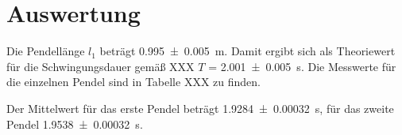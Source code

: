 \section{Auswertung}
\label{sec:Auswertung}
Die Pendellänge $l_1$ beträgt \SI{0.995 +- 0.005}{\meter}. Damit ergibt
sich als Theoriewert für die Schwingungsdauer gemäß XXX
$T$ = \SI{2.001 +- 0.005}{\second}. Die Messwerte für die einzelnen Pendel
sind in Tabelle XXX zu finden.


Der Mittelwert für das erste Pendel beträgt \SI{1.9284 +- 0.00032}{\second}, für
das zweite Pendel \SI{1.9538 +- 0.00032}{\second}.

